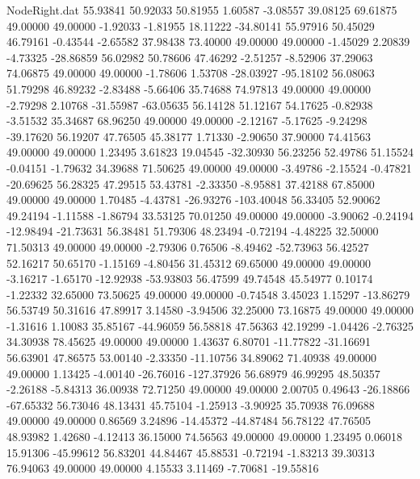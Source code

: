 \begin{filecontents}{NodeRight.dat}
  55.93841   50.92033   50.81955     1.60587   -3.08557   39.08125   69.61875   49.00000   49.00000   -1.92033   -1.81955   18.11222  -34.80141
  55.97916   50.45029   46.79161    -0.43544   -2.65582   37.98438   73.40000   49.00000   49.00000   -1.45029    2.20839   -4.73325  -28.86859
  56.02982   50.78606   47.46292    -2.51257   -8.52906   37.29063   74.06875   49.00000   49.00000   -1.78606    1.53708  -28.03927  -95.18102
  56.08063   51.79298   46.89232    -2.83488   -5.66406   35.74688   74.97813   49.00000   49.00000   -2.79298    2.10768  -31.55987  -63.05635
  56.14128   51.12167   54.17625    -0.82938   -3.51532   35.34687   68.96250   49.00000   49.00000   -2.12167   -5.17625   -9.24298  -39.17620
  56.19207   47.76505   45.38177     1.71330   -2.90650   37.90000   74.41563   49.00000   49.00000    1.23495    3.61823   19.04545  -32.30930
  56.23256   52.49786   51.15524    -0.04151   -1.79632   34.39688   71.50625   49.00000   49.00000   -3.49786   -2.15524   -0.47821  -20.69625
  56.28325   47.29515   53.43781    -2.33350   -8.95881   37.42188   67.85000   49.00000   49.00000    1.70485   -4.43781  -26.93276 -103.40048
  56.33405   52.90062   49.24194    -1.11588   -1.86794   33.53125   70.01250   49.00000   49.00000   -3.90062   -0.24194  -12.98494  -21.73631
  56.38481   51.79306   48.23494    -0.72194   -4.48225   32.50000   71.50313   49.00000   49.00000   -2.79306    0.76506   -8.49462  -52.73963
  56.42527   52.16217   50.65170    -1.15169   -4.80456   31.45312   69.65000   49.00000   49.00000   -3.16217   -1.65170  -12.92938  -53.93803
  56.47599   49.74548   45.54977     0.10174   -1.22332   32.65000   73.50625   49.00000   49.00000   -0.74548    3.45023    1.15297  -13.86279
  56.53749   50.31616   47.89917     3.14580   -3.94506   32.25000   73.16875   49.00000   49.00000   -1.31616    1.10083   35.85167  -44.96059
  56.58818   47.56363   42.19299    -1.04426   -2.76325   34.30938   78.45625   49.00000   49.00000    1.43637    6.80701  -11.77822  -31.16691
  56.63901   47.86575   53.00140    -2.33350  -11.10756   34.89062   71.40938   49.00000   49.00000    1.13425   -4.00140  -26.76016 -127.37926
  56.68979   46.99295   48.50357    -2.26188   -5.84313   36.00938   72.71250   49.00000   49.00000    2.00705    0.49643  -26.18866  -67.65332
  56.73046   48.13431   45.75104    -1.25913   -3.90925   35.70938   76.09688   49.00000   49.00000    0.86569    3.24896  -14.45372  -44.87484
  56.78122   47.76505   48.93982     1.42680   -4.12413   36.15000   74.56563   49.00000   49.00000    1.23495    0.06018   15.91306  -45.99612
  56.83201   44.84467   45.88531    -0.72194   -1.83213   39.30313   76.94063   49.00000   49.00000    4.15533    3.11469   -7.70681  -19.55816

\end{filecontents}
